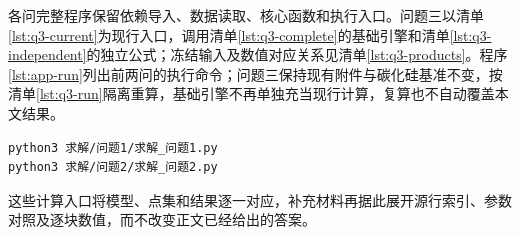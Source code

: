 各问完整程序保留依赖导入、数据读取、核心函数和执行入口。问题三以清单\ref{lst:q3-current}为现行入口，调用清单\ref{lst:q3-complete}的基础引擎和清单\ref{lst:q3-independent}的独立公式；冻结输入及数值对应关系见清单\ref{lst:q3-products}。程序\ref{lst:app-run}列出前两问的执行命令；问题三保持现有附件与碳化硅基准不变，按清单\ref{lst:q3-run}隔离重算，基础引擎不再单独充当现行计算，复算也不自动覆盖本文结果。

\begingroup
\lstset{basicstyle=\ttfamily\footnotesize,frame=single,numbers=none,breaklines=true,captionpos=t}
\begin{lstlisting}[language=bash,caption={从工作根执行前两问计算},label={lst:app-run}]
python3 求解/问题1/求解_问题1.py
python3 求解/问题2/求解_问题2.py
\end{lstlisting}
\endgroup

这些计算入口将模型、点集和结果逐一对应，补充材料再据此展开源行索引、参数对照及逐块数值，而不改变正文已经给出的答案。
